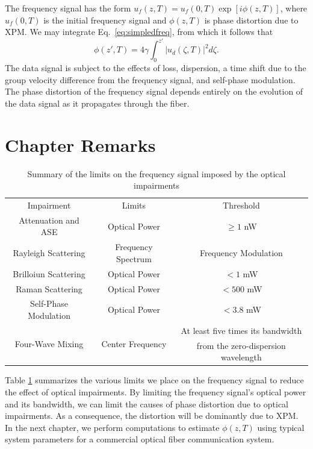 The frequency signal has the form $u_f(z,T) = u_f(0,T)\exp[i\phi(z,T)]$, where $u_f(0,T)$ is the initial frequency signal and $\phi(z,T)$ is phase distortion due to XPM. We may integrate Eq.~\ref{eq:simpledfreq}, from which it follows that
%
\begin{equation} \label{eq:phasedistort}
	\phi(z',T) = 4\gamma\int_0^{z'} |u_d(\zeta, T)|^2 d\zeta.
\end{equation}
%
The data signal is subject to the effects of loss, dispersion, a time shift due to the group velocity difference from the frequency signal, and self-phase modulation. The phase distortion of the frequency signal depends entirely on the evolution of the data signal as it propagates through the fiber.

\section{Chapter Remarks} \label{sec:3conc}

\begin{table}[h]
	\centering
	\begin{tabular}{| c | c | c |}
		\hline
		Impairment & Limits & Threshold \\ \hhline{|=|=|=|}
		Attenuation and ASE & Optical Power & $\ge 1$ nW \\ \hline
		Rayleigh Scattering & Frequency Spectrum & Frequency Modulation \\ \hline
		Brilloiun Scattering & Optical Power & $< 1$ mW \\ \hline
		Raman Scattering & Optical Power & $< 500$ mW \\ \hline
		Self-Phase Modulation & Optical Power & $< 3.8$ mW \\ \hline
		\multirow{2}{*}{Four-Wave Mixing} & \multirow{2}{*}{Center Frequency} & At least five times its bandwidth \\ 
		& & from the zero-dispersion wavelength \\ \hline
	\end{tabular}
	\caption{Summary of the limits on the frequency signal imposed by the optical impairments} \label{table:limits}
\end{table}

Table \ref{table:limits} summarizes the various limits we place on the frequency signal to reduce the effect of optical impairments. By limiting the frequency signal's optical power and its bandwidth, we can limit the causes of phase distortion due to optical impairments. As a consequence, the distortion will be dominantly due to XPM. In the next chapter, we perform computations to estimate $\phi(z,T)$ using typical system parameters for a commercial optical fiber communication system.

